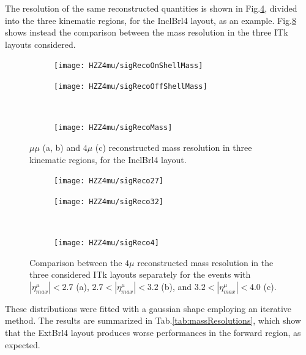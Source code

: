 \documentclass[a4paper,twoside,12pt]{article}
\begin{document}
 The resolution of the same reconstructed quantities is shown in Fig.\ref{fig:HZZ4mu:massResolution}, divided into the three kinematic regions, for the InclBrl4 layout, as an example. Fig.\ref{fig:HZZ4mu:layoutMassResolution} shows instead the comparison between the mass resolution in the three ITk layouts considered.\\

\begin{figure}
\begin{subfigure}{.5\linewidth}
\texttt{[image: HZZ4mu/sigRecoOnShellMass]}
\caption{}
\label{fig:HZZ4mu:sigRecoOnShellMass}
\end{subfigure}
\begin{subfigure}{.5\linewidth}
\centering
\texttt{[image: HZZ4mu/sigRecoOffShellMass]}
\caption{}
\label{fig:HZZ4mu:sigRecoOffShell}
\end{subfigure}\\[1ex]
\begin{subfigure}{\linewidth}
\centering
\texttt{[image: HZZ4mu/sigRecoMass]}
\caption{}
\label{fig:HZZ4mu:sigRecoMass}
\end{subfigure}
\caption{$\mu\mu$ (a, b) and $4\mu$ (c) reconstructed  mass resolution in three kinematic regions, 
		for the InclBrl4 layout.}
\label{fig:HZZ4mu:massResolution}
\end{figure}

\begin{figure}
\begin{subfigure}{.5\linewidth}
\texttt{[image: HZZ4mu/sigReco27]}
\caption{}
\label{fig:HZZ4mu:sigReco27}
\end{subfigure}
\begin{subfigure}{.5\linewidth}
\centering
\texttt{[image: HZZ4mu/sigReco32]}
\caption{}
\label{fig:HZZ4mu:sigReco32}
\end{subfigure}\\[1ex]
\begin{subfigure}{\linewidth}
\centering
\texttt{[image: HZZ4mu/sigReco4]}
\caption{}
\label{fig:HZZ4mu:sigReco4}
\end{subfigure}
\caption{Comparison between the $4\mu$ reconstructed mass resolution in the
three considered ITk layouts separately for the events with $|\eta^\mu_{max}| < 2.7$ (a),
	$2.7 < |\eta^\mu_{max}| < 3.2$ (b), and $3.2 < |\eta^\mu_{max}| < 4.0$ (c).}
\label{fig:HZZ4mu:layoutMassResolution}
\end{figure}

These distributions were fitted with a gaussian shape employing an iterative method. The results are summarized in 
Tab.\ref{tab:massResolutions}, which show that the ExtBrl4 layout produces worse performances in the forward region, as
expected. \\
\end{document}
